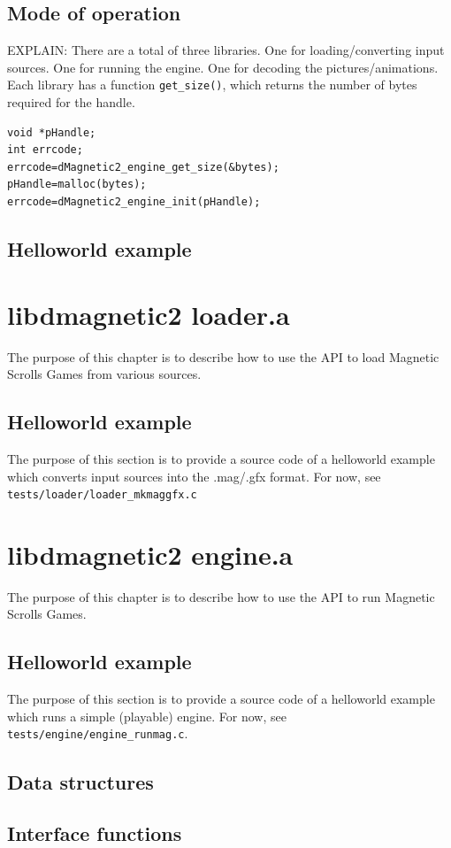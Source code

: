 \documentclass{report}
\begin{document}
\section{Mode of operation}
EXPLAIN: There are a total of three libraries. One for loading/converting input sources. One for running the engine. One for decoding the pictures/animations. 
Each library has a function \verb+get_size()+, which returns the number of bytes required for the handle. 
\begin{verbatim}
void *pHandle;
int errcode;
errcode=dMagnetic2_engine_get_size(&bytes);
pHandle=malloc(bytes);
errcode=dMagnetic2_engine_init(pHandle);
\end{verbatim}
\section{Helloworld example}
\chapter{libdmagnetic2 loader.a}
The purpose of this chapter is to describe how to use the API to load Magnetic Scrolls Games from various sources.
\section{Helloworld example}
The purpose of this section is to provide a source code of a helloworld example which converts input sources into the .mag/.gfx format.
For now, see \verb+tests/loader/loader_mkmaggfx.c+

\chapter{libdmagnetic2 engine.a}
The purpose of this chapter is to describe how to use the API to run Magnetic Scrolls Games.
\section{Helloworld example}
The purpose of this section is to provide a source code of a helloworld example which runs a simple (playable) engine.
For now, see \verb+tests/engine/engine_runmag.c+.
\section{Data structures}
\section{Interface functions}
\end{document}
